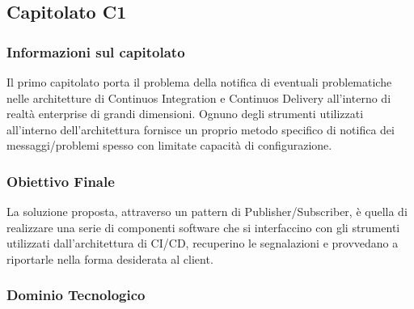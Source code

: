 \subsection{Capitolato C1}

\subsubsection{Informazioni sul capitolato}
Il primo capitolato porta il problema della notifica di eventuali problematiche nelle architetture di Continuos Integration e Continuos Delivery all'interno di realtà enterprise di grandi dimensioni. Ognuno degli strumenti utilizzati all'interno dell'architettura fornisce un proprio metodo specifico di notifica dei messaggi/problemi spesso con limitate capacità di configurazione. 
\subsubsection{Obiettivo Finale}
La soluzione proposta, attraverso un pattern di Publisher/Subscriber, è quella di realizzare una serie di componenti software che si interfaccino con gli strumenti utilizzati dall'architettura di CI/CD, recuperino  le segnalazioni e provvedano a riportarle nella forma desiderata al client.  
\subsubsection{Dominio Tecnologico}

